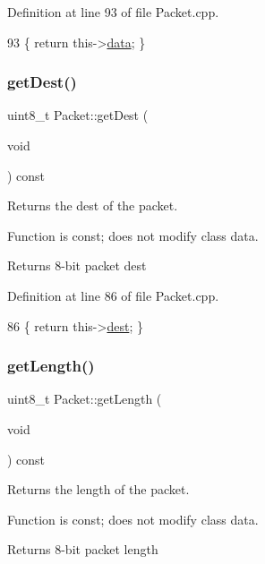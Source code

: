 Definition at line 93 of file Packet.\+cpp.


\begin{DoxyCode}
93 \{ \textcolor{keywordflow}{return} this->\hyperlink{class_packet_a3db8a3abfccbe7a2c2b8f63b4b9fb31e}{data}; \}
\end{DoxyCode}
\mbox{\label{class_packet_ad60638eee5913cc40ac737d1bdeb216b}} 
\subsubsection{\texorpdfstring{get\+Dest()}{getDest()}}
{\footnotesize\ttfamily uint8\+\_\+t Packet\+::get\+Dest (\begin{DoxyParamCaption}\item[{void}]{ }\end{DoxyParamCaption}) const}



Returns the dest of the packet. 

Function is const; does not modify class data. \begin{DoxyReturn}{Returns}
8-\/bit packet dest 
\end{DoxyReturn}


Definition at line 86 of file Packet.\+cpp.


\begin{DoxyCode}
86 \{ \textcolor{keywordflow}{return} this->\hyperlink{class_packet_a0a6e83b74c425ade443382233ccfc865}{dest}; \}
\end{DoxyCode}
\mbox{\label{class_packet_ac267547cf152cec25d0db301e5286aa7}} 
\subsubsection{\texorpdfstring{get\+Length()}{getLength()}}
{\footnotesize\ttfamily uint8\+\_\+t Packet\+::get\+Length (\begin{DoxyParamCaption}\item[{void}]{ }\end{DoxyParamCaption}) const}



Returns the length of the packet. 

Function is const; does not modify class data. \begin{DoxyReturn}{Returns}
8-\/bit packet length 
\end{DoxyReturn}


